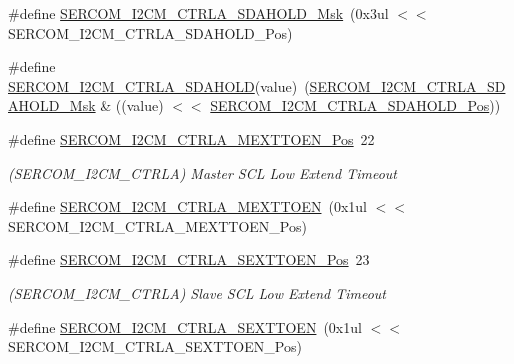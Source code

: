 \begin{DoxyCompactItemize}
\#define \mbox{\hyperlink{group___s_a_m_d21___s_e_r_c_o_m_gad92c7795b00bb0786acb6eff4051523b}{S\+E\+R\+C\+O\+M\+\_\+\+I2\+C\+M\+\_\+\+C\+T\+R\+L\+A\+\_\+\+S\+D\+A\+H\+O\+L\+D\+\_\+\+Msk}}~(0x3ul $<$$<$ S\+E\+R\+C\+O\+M\+\_\+\+I2\+C\+M\+\_\+\+C\+T\+R\+L\+A\+\_\+\+S\+D\+A\+H\+O\+L\+D\+\_\+\+Pos)
\item 
\#define \mbox{\hyperlink{group___s_a_m_d21___s_e_r_c_o_m_gae5dc19b0052b42700c75e7d17177515a}{S\+E\+R\+C\+O\+M\+\_\+\+I2\+C\+M\+\_\+\+C\+T\+R\+L\+A\+\_\+\+S\+D\+A\+H\+O\+LD}}(value)~(\mbox{\hyperlink{group___s_a_m_d21___s_e_r_c_o_m_gad92c7795b00bb0786acb6eff4051523b}{S\+E\+R\+C\+O\+M\+\_\+\+I2\+C\+M\+\_\+\+C\+T\+R\+L\+A\+\_\+\+S\+D\+A\+H\+O\+L\+D\+\_\+\+Msk}} \& ((value) $<$$<$ \mbox{\hyperlink{group___s_a_m_d21___s_e_r_c_o_m_ga00c1a039c1197e35736d6a42fedb84e2}{S\+E\+R\+C\+O\+M\+\_\+\+I2\+C\+M\+\_\+\+C\+T\+R\+L\+A\+\_\+\+S\+D\+A\+H\+O\+L\+D\+\_\+\+Pos}}))
\item 
\#define \mbox{\hyperlink{group___s_a_m_d21___s_e_r_c_o_m_ga9340ed3c3ec98ea56c0402ea05ec05a4}{S\+E\+R\+C\+O\+M\+\_\+\+I2\+C\+M\+\_\+\+C\+T\+R\+L\+A\+\_\+\+M\+E\+X\+T\+T\+O\+E\+N\+\_\+\+Pos}}~22
\begin{DoxyCompactList}\small\item\em (S\+E\+R\+C\+O\+M\+\_\+\+I2\+C\+M\+\_\+\+C\+T\+R\+LA) Master S\+CL Low Extend Timeout \end{DoxyCompactList}\item 
\#define \mbox{\hyperlink{group___s_a_m_d21___s_e_r_c_o_m_gae3806db578a2e66a22b6776b8d93a683}{S\+E\+R\+C\+O\+M\+\_\+\+I2\+C\+M\+\_\+\+C\+T\+R\+L\+A\+\_\+\+M\+E\+X\+T\+T\+O\+EN}}~(0x1ul $<$$<$ S\+E\+R\+C\+O\+M\+\_\+\+I2\+C\+M\+\_\+\+C\+T\+R\+L\+A\+\_\+\+M\+E\+X\+T\+T\+O\+E\+N\+\_\+\+Pos)
\item 
\#define \mbox{\hyperlink{group___s_a_m_d21___s_e_r_c_o_m_ga7bf65052f4d40502890e3164c6aa2d72}{S\+E\+R\+C\+O\+M\+\_\+\+I2\+C\+M\+\_\+\+C\+T\+R\+L\+A\+\_\+\+S\+E\+X\+T\+T\+O\+E\+N\+\_\+\+Pos}}~23
\begin{DoxyCompactList}\small\item\em (S\+E\+R\+C\+O\+M\+\_\+\+I2\+C\+M\+\_\+\+C\+T\+R\+LA) Slave S\+CL Low Extend Timeout \end{DoxyCompactList}\item 
\#define \mbox{\hyperlink{group___s_a_m_d21___s_e_r_c_o_m_gab7402278ce9e474a1f554bc2d8d2d2e9}{S\+E\+R\+C\+O\+M\+\_\+\+I2\+C\+M\+\_\+\+C\+T\+R\+L\+A\+\_\+\+S\+E\+X\+T\+T\+O\+EN}}~(0x1ul $<$$<$ S\+E\+R\+C\+O\+M\+\_\+\+I2\+C\+M\+\_\+\+C\+T\+R\+L\+A\+\_\+\+S\+E\+X\+T\+T\+O\+E\+N\+\_\+\+Pos)
\item 

\end{DoxyCompactItemize}
